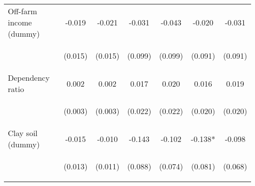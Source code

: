 \begin{center}
\begin{tabular}{lcccccc}
Off-farm income (dummy) & -0.019 & -0.021 & -0.031 & -0.043 & -0.020 & -0.031 \\
\vspace{4pt} & \begin{footnotesize}(0.015)\end{footnotesize} & \begin{footnotesize}(0.015)\end{footnotesize} & \begin{footnotesize}(0.099)\end{footnotesize} & \begin{footnotesize}(0.099)\end{footnotesize} & \begin{footnotesize}(0.091)\end{footnotesize} & \begin{footnotesize}(0.091)\end{footnotesize} \\
Dependency ratio & 0.002 & 0.002 & 0.017 & 0.020 & 0.016 & 0.019 \\
\vspace{4pt} & \begin{footnotesize}(0.003)\end{footnotesize} & \begin{footnotesize}(0.003)\end{footnotesize} & \begin{footnotesize}(0.022)\end{footnotesize} & \begin{footnotesize}(0.022)\end{footnotesize} & \begin{footnotesize}(0.020)\end{footnotesize} & \begin{footnotesize}(0.020)\end{footnotesize} \\
Clay soil (dummy) & -0.015 & -0.010 & -0.143 & -0.102 & -0.138* & -0.098 \\
\vspace{4pt} & \begin{footnotesize}(0.013)\end{footnotesize} & \begin{footnotesize}(0.011)\end{footnotesize} & \begin{footnotesize}(0.088)\end{footnotesize} & \begin{footnotesize}(0.074)\end{footnotesize} & \begin{footnotesize}(0.081)\end{footnotesize} & \begin{footnotesize}(0.068)\end{footnotesize} \\

\end{tabular}
\end{center}
